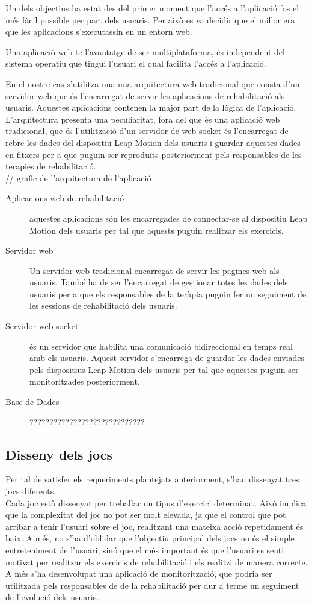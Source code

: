 \documentclass[12pt,a4paper,catalan]{article}
\begin{document}
	Un dels objectius ha estat des del primer moment que l'accés a l'aplicació fos el més fàcil possible per part dels usuaris. Per això es va decidir que el millor era que les aplicacions s'executassin en un entorn web.
	
	Una aplicació web te l'avantatge de ser multiplataforma, és independent del sistema operatiu que tingui l'usuari el qual facilita l'accés a l'aplicació.
	
	En el nostre cas s'utilitza una una arquitectura web tradicional que consta d'un servidor web que és l'encarregat de servir les aplicacions de rehabilitació als usuaris. Aquestes aplicacions contenen la major part de la lògica de l'aplicació. L'arquitectura presenta una peculiaritat, fora del que és una aplicació web tradicional, que és l'utilització d'un servidor de web socket és l'encarregat de rebre les dades del dispositiu Leap Motion dels usuaris i guardar aquestes dades en fitxers per a que puguin ser reproduïts posteriorment pels responsables de les terapies de rehabilitació.\\
	
	// grafic de l'arquitectura de l'aplicació
	
	\begin{description}
		\item [Aplicacions web de rehabilitació] aquestes aplicacions són les encarregades de connectar-se al dispositiu Leap Motion dels usuaris per tal que aquests puguin realitzar els exercicis.
		\item [Servidor web] Un servidor web tradicional encarregat de servir les pagines web als usuaris. També ha de ser l'encarregat de gestionar totes les dades dels usuaris per a que els responsables de la teràpia puguin fer un seguiment de les sessions de rehabilitació dels usuaris.
		\item [Servidor web socket] és un servidor que habilita una comunicació bidireccional en temps real amb els usuaris. Aquest servidor s'encarrega de guardar les dades enviades pels dispositius Leap Motion dels usuaris per tal que aquestes puguin ser monitoritzades posteriorment.
		\item [Base de Dades] ?????????????????????????????
	\end{description}
	\subsection{Disseny dels jocs}
	Per tal de satisfer els requeriments plantejats anteriorment, s'han dissenyat tres jocs diferents.\\
	Cada joc està dissenyat per treballar un tipus d'exercici determinat. Això implica que la complexitat del joc no pot ser molt elevada, ja que el control que pot arribar a tenir l'usuari sobre el joc, realitzant una mateixa acció repetidament és baix. A més, no s'ha d'oblidar que l'objectiu principal dels jocs no és el simple entreteniment de l'usuari, sinó que el més important és que l'usuari es senti motivat per realitzar els exercicis de rehabilitació i els realitzi de manera correcte.\\
	A més s'ha desenvolupat una aplicació de monitorització, que podria ser utilitzada pels responsables de de la rehabilitació per dur a terme un seguiment de l'evolució dels usuaris.
\end{document}
